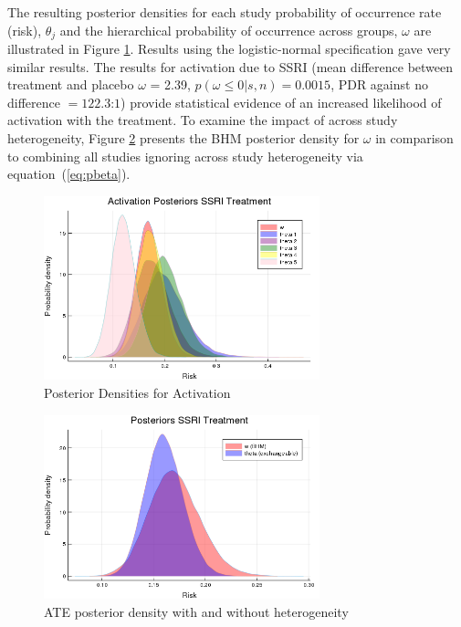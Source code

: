 \documentclass{juliacon}
\begin{document}
The resulting posterior densities for each study probability of occurrence rate (risk), $\theta_j$ and the hierarchical probability of occurrence across groups, $\omega$ are illustrated in Figure \ref{fig:activ}. Results using the logistic-normal specification gave very similar results. The results for activation due to SSRI (mean difference between treatment and placebo $\omega$ = 2.39, $p(\omega \le 0|s,n) = 0.0015$, PDR against no difference $= 122.3$:$1$) provide statistical evidence of an increased likelihood of activation with the treatment. To examine the impact of across study heterogeneity, Figure \ref{fig:compare} presents the BHM posterior density for $\omega$ in comparison to combining all studies ignoring across study heterogeneity via equation~(\ref{eq:pbeta}).

\begin{figure}[t]
	\centerline{\includegraphics[width=8cm]{activation_posteriors.png}}
	\caption{Posterior Densities for Activation}
	\label{fig:activ}
\end{figure}

\begin{figure}[t]
	\centerline{\includegraphics[width=8cm]{bhm_vs_non_compare.png}}
	\caption{ATE posterior density with and without heterogeneity}
	\label{fig:compare}
\end{figure}
 
\end{document}
